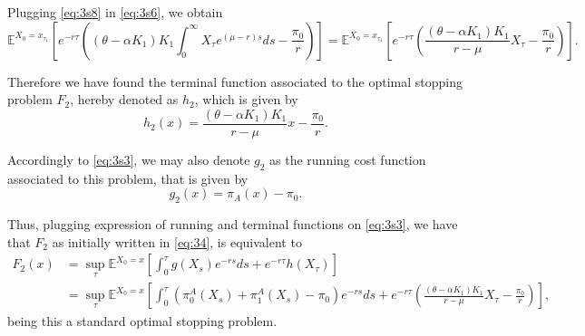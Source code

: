
Plugging \eqref{eq:3s8} in \eqref{eq:3s6}, we obtain
\begin{equation}
\mathds{E}^{X_0=x_{\tau_1}} \left[ e^{-r\tau}  \left(  (\theta-\alpha K_1)K_1 \int_{0}^\infty X_{\tau} e^{\left( \mu-r \right)s} ds -\frac{\pi_0}{r} \right) \right] 
=  \mathds{E}^{X_0=x_{\tau_1}} \left[ e^{-r\tau}  \left(   \frac{(\theta-\alpha K_1)K_1}{r-\mu} X_{\tau} -\frac{\pi_0}{r} \right) \right].
\label{eq:3s9}
\end{equation}

Therefore we have found the terminal function associated to the optimal stopping problem $F_2$, hereby denoted as $h_2$, which is given by
$$h_2(x)=\frac{(\theta-\alpha K_1)K_1}{r-\mu} x -\frac{\pi_0}{r}.$$

Accordingly to \eqref{eq:3s3}, we may also denote $g_2$ as the running cost function associated to this problem, that is given by
$$g_2(x)=\pi_A(x)-\pi_0.$$

Thus, plugging expression of running and terminal functions on \eqref{eq:3s3}, we have that $F_2$ as initially written in \eqref{eq:34}, is equivalent to
\begin{align}
F_2(x)&=\sup_{\tau} \mathds{E}^{X_0=x} \left[ \int_0^{\tau} g(X_s) e^{-rs}ds + e^{-r\tau}h(X_\tau)  \right]\\
&=\sup_{\tau} \mathds{E}^{X_0=x} \left[ \int_0^{\tau} \left( \pi_0^A(X_s)+\pi_1^A(X_s)-\pi_0 \right) e^{-rs}ds + e^{-r\tau} \left(   \frac{(\theta-\alpha K_1)K_1}{r-\mu} X_{\tau} -\frac{\pi_0}{r} \right)  \right],
\label{eq:3s10}
\end{align}
being this a standard optimal stopping problem.

